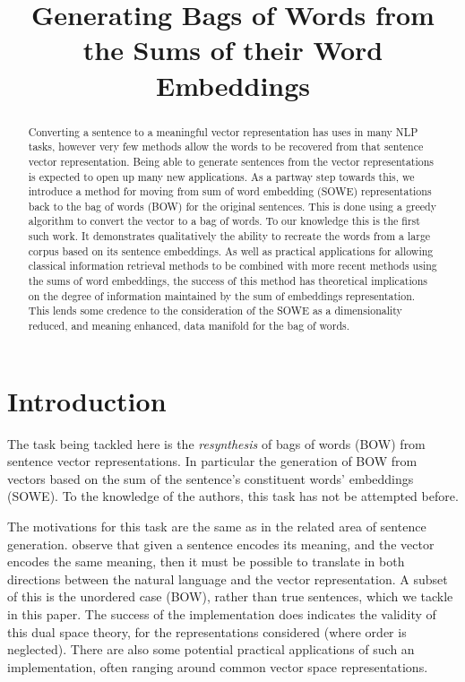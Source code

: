 \documentclass{llncs}
\title{Generating Bags of Words from the Sums of their Word Embeddings}
\author{}
\begin{document}
\maketitle

\begin{abstract}
Converting a sentence to a meaningful vector representation has uses in many NLP tasks, however very few methods allow the words to be recovered from that sentence vector representation. Being able to generate sentences from the vector representations is expected to open up many new applications. As a partway step towards this, we introduce a method for moving from sum of word embedding (SOWE) representations back to the bag of words (BOW) for the original sentences. This is done using a greedy algorithm to convert the vector to a bag of words. To our knowledge this is the first such work. It demonstrates qualitatively the ability to recreate the words from a large corpus based on its sentence embeddings.
As well as practical applications for allowing classical information retrieval methods to be combined with more recent methods using the sums of word embeddings, the success of this method has theoretical implications on the degree of information maintained by the sum of embeddings representation. This lends some credence to the consideration of the SOWE as a dimensionality reduced, and meaning enhanced, data manifold for the bag of words.  
\end{abstract}

\section{Introduction} \label{intro}


The task being tackled here is the \emph{resynthesis} of bags of words (BOW) from sentence vector representations. In particular the generation of BOW from vectors based on the sum of the sentence's constituent words' embeddings (SOWE). To the knowledge of the authors, this task has not be attempted before.

The motivations for this task are the same as in the related area of sentence generation. \textcite{Dinu2014CompositionalGeneration} observe that given  a sentence encodes its meaning, and the vector encodes the same meaning, then it must be possible to translate in both directions between the natural language and the vector representation. A subset of this is the unordered case (BOW), rather than true sentences, which we tackle in this paper. The success of the implementation does indicates the validity of this dual space theory, for the representations considered (where order is neglected).  There are also some potential practical applications of such an implementation, often ranging around common vector space representations.
\end{document}

